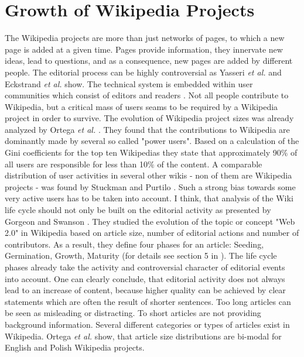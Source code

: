 \documentclass[a4paper,10pt]{scrbook}
\begin{document}








\section{Growth of Wikipedia Projects}
The Wikipedia projects are more than just networks of pages, to which a new page is added at a given time. Pages provide information, they innervate new ideas, lead to questions, and as a consequence, new pages are added by different people. The editorial process can be highly controversial as Yasseri \textit{et al.} \cite{Yasseri2012} and Eckstrand \textit{et al.} \cite{Ekstrand2009} show. The technical system is embedded within user communities which consist of editors and readers . Not all people contribute to Wikipedia, but a critical mass of users seams to be required by a Wikipedia project in order to survive. The evolution of Wikipedia project sizes was already analyzed by Ortega \textit{et al.} \cite{Ortega2007}. They found that the contributions to Wikipedia are dominantly made by several so called "power users". Based on a calculation of the Gini coefficients for the top ten Wikipedias they state that approximately 90$\%$ of all users are responsible for less than 10$\%$ of the content. A comparable distribution of user activities in several other wikis - non of them are Wikipedia projects - was found by Stuckman and Purtilo \cite{Stuckman2009}. Such a strong bias towards some very active users has to be taken into account. I think, that analysis of the Wiki life cycle should not only be built on the editorial activity as presented by Gorgeon and Swanson \cite{Gorgeon2009}. They studied the evolution of the topic or concept "Web 2.0" in Wikipedia based on article size, number of editorial actions and number of contributors. As a result, they define four phases for an article: Seeding, Germination, Growth, Maturity (for details see section 5 in \cite{Gorgeon2009}). The life cycle phases already take the activity and controversial character of editorial events into account. One can clearly conclude, that editorial activity does not always lead to an increase of content, because higher quality can be achieved by clear statements which are often the result of shorter sentences. Too long articles can be seen as misleading or distracting. To short articles are not providing background information. Several different categories or types of articles exist in Wikipedia. Ortega \textit{et al.} \cite{Ortega2007} show, that article size distributions are bi-modal for English and Polish Wikipedia projects. 
\end{document}
